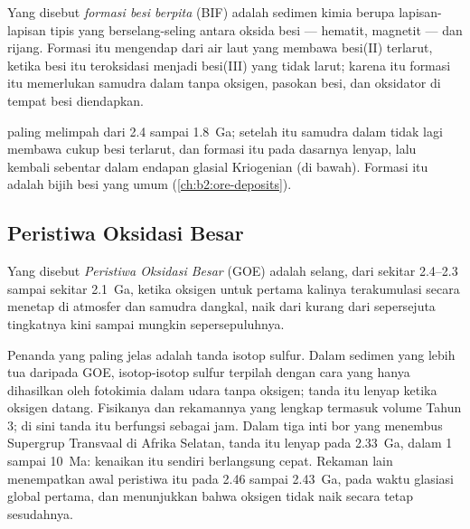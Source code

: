 \begin{definition}\label{def:b2:precambrian-earth:bif}
Yang disebut \emph{formasi besi berpita} (BIF) adalah sedimen kimia berupa
lapisan-lapisan tipis yang berselang-seling antara oksida besi --- hematit, magnetit --- dan rijang. Formasi itu mengendap
dari air laut yang membawa besi(II) terlarut, ketika besi itu teroksidasi menjadi besi(III) yang tidak larut;
karena itu formasi itu memerlukan samudra dalam tanpa oksigen, pasokan besi, dan oksidator
di tempat besi diendapkan.
\end{definition}

 paling melimpah dari 2.4 sampai \qty{1.8}{Ga}; setelah itu samudra dalam
tidak lagi membawa cukup besi terlarut, dan formasi itu pada dasarnya lenyap, lalu kembali sebentar dalam
endapan glasial Kriogenian (di bawah). Formasi itu adalah bijih besi yang umum
(\cref{ch:b2:ore-deposits}).

\subsection*{Peristiwa Oksidasi Besar}

\begin{definition}\label{def:b2:precambrian-earth:goe}
Yang disebut \emph{Peristiwa Oksidasi Besar} (GOE) adalah selang, dari sekitar
2.4--2.3 sampai sekitar \qty{2.1}{Ga}, ketika oksigen untuk pertama kalinya terakumulasi secara menetap di
atmosfer dan samudra dangkal, naik dari kurang dari sepersejuta tingkatnya kini sampai
mungkin sepersepuluhnya.
\end{definition}

Penanda yang paling jelas adalah tanda isotop sulfur. Dalam sedimen yang lebih tua daripada GOE,
isotop-isotop sulfur terpilah dengan cara yang hanya dihasilkan oleh fotokimia dalam udara tanpa oksigen;
tanda itu lenyap ketika oksigen datang. Fisikanya dan rekamannya yang lengkap termasuk
volume Tahun 3; di sini tanda itu berfungsi sebagai jam. Dalam tiga inti bor yang menembus Supergrup
Transvaal di Afrika Selatan, tanda itu lenyap pada \qty{2.33}{Ga}, dalam 1 sampai \qty{10}{Ma}:
kenaikan itu sendiri berlangsung cepat. Rekaman lain menempatkan awal peristiwa itu pada 2.46 sampai \qty{2.43}{Ga},
pada waktu glasiasi global pertama, dan menunjukkan bahwa oksigen tidak naik secara tetap
sesudahnya.

